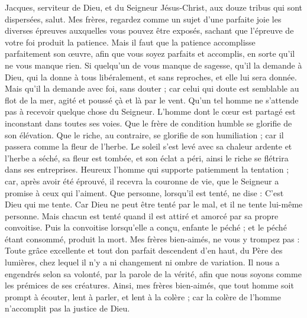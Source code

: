\begin{multicols}{2}
\TextTitle{[Introduction]}
\VerseOne{}Jacques, serviteur de Dieu, et du Seigneur Jésus-Christ, aux douze tribus qui sont dispersées, salut.
Mes frères, regardez comme un sujet d'une parfaite joie les diverses épreuves auxquelles vous pouvez être exposés,
sachant que l'épreuve de votre foi produit la patience.
Mais il faut que la patience accomplisse parfaitement son œuvre, afin que vous soyez parfaits et accomplis, en sorte qu’il ne vous manque rien.
Si quelqu'un de vous manque de sagesse, qu'il la demande à Dieu, qui la donne à tous libéralement, et sans reproches, et elle lui sera donnée.
Mais qu'il la demande avec foi, sans douter ; car celui qui doute est semblable au flot de la mer, agité et poussé çà et là par le vent.
Qu’un tel homme ne s'attende pas à recevoir quelque chose du Seigneur.
L'homme dont le cœur est partagé est inconstant dans toutes ses voies.
Que le frère de condition humble se glorifie de son élévation.
Que le riche, au contraire, se glorifie de son humiliation ; car il passera comme la fleur de l'herbe.
Le soleil s'est levé avec sa chaleur ardente et l'herbe a séché, sa fleur est tombée, et son éclat a péri, ainsi le riche se flétrira dans ses entreprises.
Heureux l'homme qui supporte patiemment la tentation{} ; car, après avoir été éprouvé, il recevra la couronne de vie, que le Seigneur a promise à ceux qui l'aiment.
Que personne, lorsqu’il est tenté, ne dise : C’est Dieu qui me tente. Car Dieu ne peut être tenté par le mal, et il ne tente lui-même personne.
Mais chacun est tenté quand il est attiré et amorcé par sa propre convoitise.
Puis la convoitise lorsqu’elle a conçu, enfante le péché ; et le péché étant consommé, produit la mort.
Mes frères bien-aimés, ne vous y trompez pas :
Toute grâce excellente et tout don parfait descendent d’en haut, du Père des lumières, chez lequel il n'y a ni changement ni ombre de variation.
Il nous a engendrés selon sa volonté, par la parole de la vérité, afin que nous soyons comme les prémices de ses créatures.
Ainsi, mes frères bien-aimés, que tout homme soit prompt à écouter, lent à parler, et lent à la colère ;
car la colère de l'homme n'accomplit pas la justice de Dieu.

\end{multicols}
